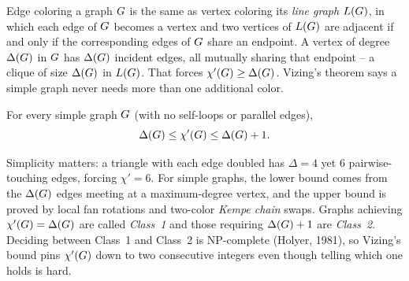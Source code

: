 \begin{intuitionbox}
Edge coloring a graph $G$ is the same as vertex coloring its \emph{line graph}
$L(G)$, in which each edge of $G$ becomes a vertex and two vertices of $L(G)$ are adjacent if and only if the corresponding edges of $G$
share an endpoint. A vertex of degree $\Delta(G)$ in $G$ has $\Delta(G)$
incident edges, all mutually sharing that endpoint -- a clique of size $\Delta(G)$ in $L(G)$.
That forces $\chi'(G)\ge\Delta(G)$. Vizing's theorem says a simple graph never needs more than
one additional color.
\end{intuitionbox}

\begin{theorem}[Vizing, 1964]
\label{ch28:thm-vizing}
For every simple graph $G$ (with no self-loops or parallel edges),
\[
  \Delta(G) \le \chi'(G) \le \Delta(G)+1.
\]
\end{theorem}

Simplicity matters: a triangle with each edge doubled has $\Delta=4$ yet $6$ pairwise-touching edges, forcing $\chi'=6$. For simple graphs, the lower bound comes from the $\Delta(G)$ edges meeting at a maximum-degree vertex, and the upper bound is proved by local fan rotations and two-color \emph{Kempe chain} swaps. Graphs achieving $\chi'(G)=\Delta(G)$ are called \emph{Class~1} and those requiring $\Delta(G)+1$ are \emph{Class~2}. Deciding between Class~1 and Class~2 is NP-complete (Holyer, 1981), so Vizing's bound pins $\chi'(G)$ down to two consecutive integers even though telling which one holds is hard.

